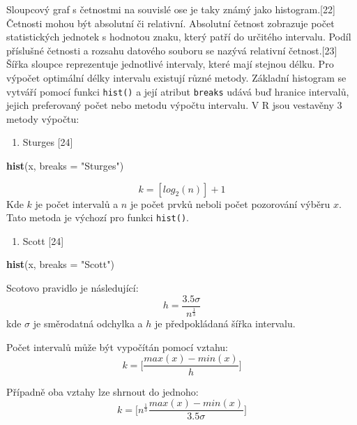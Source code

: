 \documentclass[12pt,]{article}
\newenvironment{Shaded}{\begin{snugshade}}{\end{snugshade}}
\newcommand{\KeywordTok}[1]{\textcolor[rgb]{0.13,0.29,0.53}{\textbf{#1}}}
\newcommand{\DataTypeTok}[1]{\textcolor[rgb]{0.13,0.29,0.53}{#1}}
\newcommand{\StringTok}[1]{\textcolor[rgb]{0.31,0.60,0.02}{#1}}
\newcommand{\NormalTok}[1]{#1}
\providecommand{\tightlist}{%
  \setlength{\itemsep}{0pt}\setlength{\parskip}{0pt}}
\begin{document}
\qquad Sloupcový graf s četnostmi na souvislé ose je taky známý jako
histogram.{[}22{]} Četnosti mohou být absolutní či relativní. Absolutní
četnost zobrazuje počet statistických jednotek s hodnotou znaku, který
patří do určitého intervalu. Podíl příslušné četnosti a rozsahu datového
souboru se nazývá relativní četnost.{[}23{]} Šířka sloupce reprezentuje
jednotlivé intervaly, které mají stejnou délku. Pro výpočet optimální
délky intervalu existují různé metody. Základní histogram se vytváří
pomocí funkci \texttt{hist()} a její atribut \texttt{breaks} udává buď
hranice intervalů, jejich preferovaný počet nebo metodu výpočtu
intervalu. V R jsou vestavěny 3 metody výpočtu:

\newpage

\begin{enumerate}
\def\labelenumi{\arabic{enumi}.}
\tightlist
\item
  Sturges {[}24{]}
\end{enumerate}

\begin{Shaded}
\begin{Highlighting}[]
\KeywordTok{hist}\NormalTok{(x, }\DataTypeTok{breaks =} \StringTok{"Sturges"}\NormalTok{)}
\end{Highlighting}
\end{Shaded}

\[k=[log_2(n)]+1\] Kde \(k\) je počet intervalů a \(n\) je počet prvků
neboli počet pozorování výběru \(x\). Tato metoda je výchozí pro funkci
\texttt{hist()}.

\begin{enumerate}
\def\labelenumi{\arabic{enumi}.}
\setcounter{enumi}{1}
\tightlist
\item
  Scott {[}24{]}
\end{enumerate}

\begin{Shaded}
\begin{Highlighting}[]
\KeywordTok{hist}\NormalTok{(x, }\DataTypeTok{breaks =} \StringTok{"Scott"}\NormalTok{)}
\end{Highlighting}
\end{Shaded}

Scotovo pravidlo je následující:
\[h=\frac{3.5 \sigma}{n^{\frac{1}{3}}}\] kde \(\sigma\) je směrodatná
odchylka a \(h\) je předpokládaná šířka intervalu.

Počet intervalů může být vypočítán pomocí vztahu:
\[k=\Big[\frac{max(x)-min(x)}{h}\Big]\]

Případně oba vztahy lze shrnout do jednoho:
\[k = \Big[n^{\frac{1}{3}}{\frac{max(x)-min(x)}{3.5 \sigma}}\Big]\]
\end{document}
